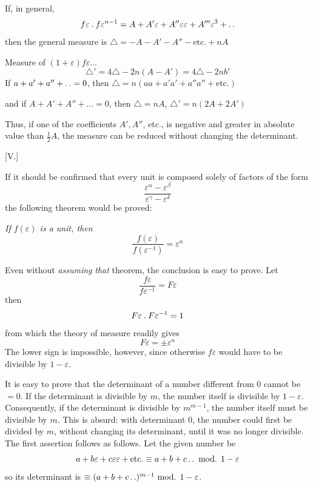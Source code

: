 If, in general,
\[
f\varepsilon\mathbin{.} f\varepsilon^{n-1}=A+A'\varepsilon+A''\varepsilon\varepsilon+A'''\varepsilon^3+\mathinner{.\,.}
\]
then the general measure is $\triangle=-A-A'-A''-\text{etc.}+nA$

Measure of $(1+\varepsilon)f\varepsilon\ldots$
\[
\triangle'=4\triangle-2n(A-A')=4\triangle-2nb'
\]
If $a+a'+a''+\mathinner{.\,.}=0$, then $\triangle=n(aa+a'a'+a''a''+\text{etc.})$

and if $A+A'+A''+\ldots=0$, then $\triangle=nA$, $\triangle'=n(2A+2A')$

Thus, if one of the coefficients $A',A''$, etc., is negative and greater in absolute value than $\frac12A$, the measure can be reduced without changing the determinant.

%
\begin{center}[V.]\end{center}
If it should be confirmed that every unit is composed solely of factors of the form
\[
\frac{\varepsilon^\alpha-\varepsilon^\beta}{\varepsilon^\gamma-\varepsilon^\delta}
\]
the following theorem would be proved:

\emph{If $f(\varepsilon)$ is a unit, then}
\[
\frac{f(\varepsilon)}{f(\varepsilon^{-1})}=\varepsilon^n
\]

Even without \emph{assuming} \emph{that} theorem, the conclusion is easy to prove.
Let
\[
\frac{f\varepsilon}{f\varepsilon^{-1}}=F\varepsilon
\]
then
\[
F\varepsilon\mathbin{.} F\varepsilon^{-1}=1
\]
from which the theory of measure readily gives
\[
F\varepsilon=\pm\varepsilon^n
\]
The lower sign is impossible, however, since otherwise $f\varepsilon$ would have to be divisible by $1-\varepsilon$.

It is easy to prove that the determinant of a number different from $0$ cannot be $=0$. If the determinant is divisible by $m$, the number itself is divisible by $1-\varepsilon$. Consequently, if the determinant is divisible by $m^{m-1}$, the number itself must be divisible by $m$. This is absurd: with determinant $0$, the number could first be divided by $m$, without changing its determinant, until it was no longer divisible. The first assertion follows as follows. Let the given number be
\[
a+b\varepsilon+c\varepsilon\varepsilon+\text{etc.}\equiv a+b+c\mathinner{.\,.}\text{ mod. }1-\varepsilon
\]
so its determinant is $\equiv(a+b+c\mathinner{.\,.})^{m-1}\text{ mod. }1-\varepsilon$.

